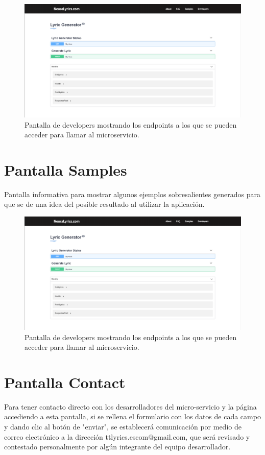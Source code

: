 \documentclass[12pt, a4paper, titlepage]{article}
\begin{document}
		\begin{figure}[H] 
			\includegraphics[width=13.5cm]{./Imagenes/Capturas/pdev.png}
			\centering \caption{Pantalla de developers mostrando los endpoints a los que se pueden acceder para llamar al microservicio.}
		\end{figure}
		
		\section{Pantalla Samples}
		Pantalla informativa para mostrar algunos ejemplos sobresalientes generados para que se de una idea del posible resultado al utilizar la aplicación.
		
		\begin{figure}[H] 
			\includegraphics[width=13.5cm]{./Imagenes/Capturas/pdev.png}
			\centering \caption{Pantalla de developers mostrando los endpoints a los que se pueden acceder para llamar al microservicio.}
		\end{figure}
	
		\section{Pantalla Contact}
		Para tener contacto directo con los desarrolladores del micro-servicio y la página accediendo a esta pantalla, si se rellena el formulario con los datos de cada campo y dando clic al botón de "enviar", se establecerá comunicación por medio de correo electrónico a la dirección ttlyrics.escom@gmail.com, que será revisado y contestado personalmente por algún integrante del equipo desarrollador.
		
\end{document}
